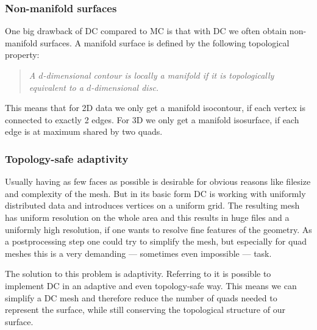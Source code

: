 \subsubsection{Non-manifold surfaces}
One big drawback of \ac{DC} compared to \ac{MC} is that with \ac{DC} we often obtain non-manifold surfaces. A manifold surface is defined by the following topological property:
\begin{quote}
\emph{A $d$-dimensional contour is locally a \emph{manifold} if it is topologically equivalent to a $d$-dimensional disc.}\cite{Hermite2002}
\end{quote}
This means that for 2D data we only get a manifold isocontour, if each vertex is connected to exactly 2 edges. For 3D we only get a manifold isosurface, if each edge is at maximum shared by two \acp{quad}. 

\subsubsection{Topology-safe adaptivity}
Usually having as few faces as possible is desirable for obvious reasons like filesize and complexity of the mesh. But in its basic form \ac{DC} is working with uniformly distributed data and introduces vertices on a uniform grid. The resulting mesh has uniform resolution on the whole area and this results in huge files and a uniformly high resolution, if one wants to resolve fine features of the geometry. As a postprocessing step one could try to simplify the mesh, but especially for \ac{quad} meshes this is a very demanding --- sometimes even impossible --- task.

The solution to this problem is adaptivity. Referring to \cite{Hermite2002} it is possible to implement \ac{DC} in an adaptive and even topology-safe way. This means we can simplify a \ac{DC} mesh and therefore reduce the number of \acp{quad} needed to represent the surface, while still conserving the topological structure of our surface.